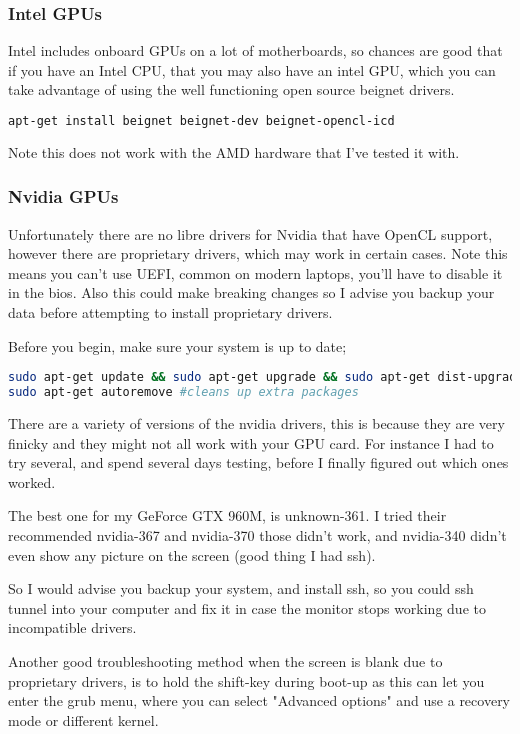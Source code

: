 \documentclass[12pt]{report}
\begin{document}
\subsubsection{Intel GPUs}
Intel includes onboard GPUs on a lot of motherboards, 
so chances are good that if you have an Intel CPU, that you may also have an
intel GPU, which you can take advantage of using the well functioning open
source beignet drivers.

\begin{lstlisting}[language=bash]
apt-get install beignet beignet-dev beignet-opencl-icd
\end{lstlisting}

Note this does not work with the AMD hardware that I've tested it with.

\subsubsection{Nvidia GPUs}
Unfortunately there are no libre drivers for Nvidia that have OpenCL support,
however there are proprietary drivers, which may work in certain cases. 
Note this means you can't use UEFI, common on modern laptops, you'll have to
disable it in the bios.  Also this could make breaking changes so I advise you
backup your data before attempting to install proprietary drivers. 

Before you begin, make sure your system is up to date;
\begin{lstlisting}[language=bash]
sudo apt-get update && sudo apt-get upgrade && sudo apt-get dist-upgrade;
sudo apt-get autoremove #cleans up extra packages
\end{lstlisting}

There are a variety of versions of the nvidia drivers, this is because they are
very finicky and they might not all work with your GPU card.  For instance I had
to try several, and spend several days testing, before I finally figured out
which ones worked. 

The best one for my GeForce GTX 960M, is unknown-361. I tried their recommended
nvidia-367 and nvidia-370 those didn't work, and nvidia-340 didn't even show any
picture on the screen (good thing I had ssh). 

So I would advise you backup your system, and install ssh, so you could ssh
tunnel into your computer and fix it in case the monitor stops working due to
incompatible drivers. 

Another good troubleshooting method when the screen is blank due to proprietary
drivers, is to hold the shift-key during boot-up as this can let you enter the
grub menu, where you can select "Advanced options" and use a recovery mode or
different kernel. 
\end{document}
